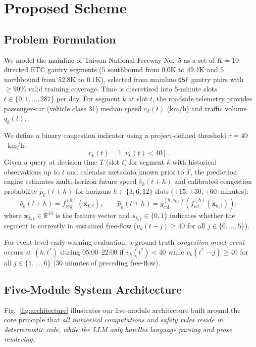 \section{Proposed Scheme}\label{sec:method}

\subsection{Problem Formulation}
We model the mainline of Taiwan National Freeway No.~5 as a set of $K=10$ directed ETC gantry segments (5 southbound from 0.0K to 49.4K and 5 northbound from 52.8K to 0.1K), selected from mainline \texttt{05F} gantry pairs with $\ge 90\%$ valid training coverage. Time is discretized into 5-minute slots $t \in \{0, 1, \dots, 287\}$ per day. For segment $k$ at slot $t$, the roadside telemetry provides passenger-car (vehicle class 31) median speed $v_k(t)$ (km/h) and traffic volume $q_k(t)$.

We define a binary congestion indicator using a project-defined threshold $\tau = 40$~km/h:
\begin{equation}
c_k(t) = \mathbb{I}\!\left[v_k(t) < 40\right].
\label{eq:cong_ind}
\end{equation}
Given a query at decision time $T$ (slot $t$) for segment $k$ with historical observations up to $t$ and calendar metadata known prior to $T$, the prediction engine estimates multi-horizon future speed $\hat{v}_k(t+h)$ and calibrated congestion probability $\hat{p}_k(t+h)$ for horizons $h \in \{3, 6, 12\}$ slots ($+15, +30, +60$~minutes):
\begin{equation}
\hat{v}_k(t+h) = f_{\text{reg}}^{(h)}(\mathbf{x}_{k,t}), \qquad
\hat{p}_k(t+h) = g_{\text{cal}}^{(h, s_{k,t})}\!\left(f_{\text{clf}}^{(h)}(\mathbf{x}_{k,t})\right),
\label{eq:forecast}
\end{equation}
where $\mathbf{x}_{k,t} \in \mathbb{R}^{13}$ is the feature vector and $s_{k,t} \in \{0,1\}$ indicates whether the segment is currently in sustained free-flow ($v_k(t-j) \ge 40$ for all $j \in \{0,\dots,5\}$).

For event-level early-warning evaluation, a ground-truth \textit{congestion onset event} occurs at $(k, t^*)$ during 05:00--22:00 if $v_k(t^*) < 40$ while $v_k(t^*-j) \ge 40$ for all $j \in \{1,\dots,6\}$ (30 minutes of preceding free-flow).

\subsection{Five-Module System Architecture}
Fig.~\ref{fig:architecture} illustrates our five-module architecture built around the core principle that \textit{all numerical computations and safety rules reside in deterministic code, while the LLM only handles language parsing and prose rendering}.

